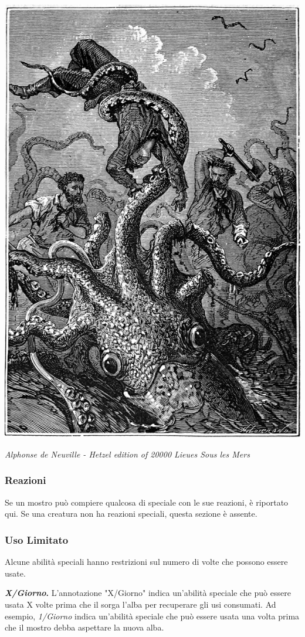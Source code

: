 \begin{multicols}{2}
\begin{center}
	\includegraphics[width=0.65\linewidth]{immagini/polpo.png}
	
	\emph{Alphonse de Neuville - Hetzel edition of 20000 Lieues Sous les Mers}
\end{center}

\subsubsection{Reazioni}

Se un mostro può compiere qualcosa di speciale con le sue reazioni, è riportato qui. Se una creatura non ha reazioni speciali, questa sezione è assente.

\subsubsection{Uso Limitato}

Alcune abilità speciali hanno restrizioni sul numero di volte che possono essere usate.

\textbf{\emph{X/Giorno}.} L'annotazione "X/Giorno" indica un'abilità speciale che può essere usata X volte prima che il sorga l'alba per recuperare gli usi consumati. Ad esempio, \emph{1/Giorno} indica un'abilità speciale che può essere usata una volta prima che il mostro debba aspettare la nuova alba.


\end{multicols}
